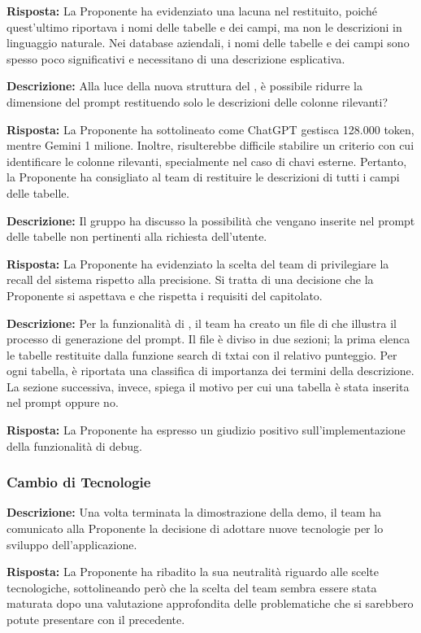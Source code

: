 \par \textbf{Risposta:} La Proponente ha evidenziato una lacuna nel  restituito, poiché quest'ultimo riportava i nomi delle tabelle e dei campi, ma non le descrizioni in linguaggio naturale. Nei database aziendali, i nomi delle tabelle e dei campi sono spesso poco significativi e necessitano di una descrizione esplicativa.
\par \textbf{Descrizione:} Alla luce della nuova struttura del , è possibile ridurre la dimensione del prompt restituendo solo le descrizioni delle colonne rilevanti?
\par \textbf{Risposta:} La Proponente ha sottolineato come ChatGPT gestisca 128.000 token, mentre Gemini 1 milione. Inoltre, risulterebbe difficile stabilire un criterio con cui identificare le colonne rilevanti, specialmente nel caso di chavi esterne. Pertanto, la Proponente ha consigliato al team di restituire le descrizioni di tutti i campi delle tabelle.

\par \textbf{Descrizione:} Il gruppo ha discusso la possibilità che vengano inserite nel prompt delle tabelle non pertinenti alla richiesta dell'utente.

\par \textbf{Risposta:} La Proponente ha evidenziato la scelta del team di privilegiare la recall del sistema rispetto alla precisione. Si tratta di una decisione che la Proponente si aspettava e che rispetta i requisiti del capitolato.

\par \textbf{Descrizione:} Per la funzionalità di , il team ha creato un file di  che illustra il processo di generazione del prompt. Il file è diviso in due sezioni; la prima elenca le tabelle restituite dalla funzione search di txtai con il relativo punteggio. Per ogni tabella, è riportata una classifica di importanza dei termini della descrizione. La sezione successiva, invece, spiega il motivo per cui una tabella è stata inserita nel prompt oppure no.
\par \textbf{Risposta:} La Proponente ha espresso un giudizio positivo sull'implementazione della funzionalità di debug.


\subsubsection{Cambio di Tecnologie}

\par \textbf{Descrizione:} Una volta terminata la dimostrazione della demo, il team ha comunicato alla Proponente la decisione di adottare nuove tecnologie per lo sviluppo dell'applicazione.
\par \textbf{Risposta:} La Proponente ha ribadito la sua neutralità riguardo alle scelte tecnologiche, sottolineando però che la scelta del team sembra essere stata maturata dopo una valutazione approfondita delle problematiche che si sarebbero potute presentare con il  precedente.

